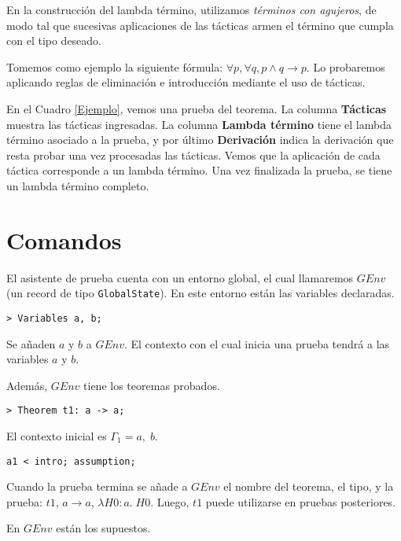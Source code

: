 \documentclass[a4paper,11pt]{article}
\theoremstyle{definition}
\begin{document}
\begin{table}[]
\begin{tabular}{|c|c|c|}
\end{tabular}
\end{table}

En la construcción del lambda término, utilizamos \textit{términos con agujeros}, de modo tal que sucesivas aplicaciones 
de las tácticas armen el término que cumpla con el tipo deseado.

Tomemos como ejemplo la siguiente fórmula: $\forall p, \forall q, p \wedge q \rightarrow p$.
Lo probaremos aplicando reglas de eliminación e introducción mediante el uso de tácticas.

En el Cuadro \ref{Ejemplo}, vemos una prueba del teorema.
La columna \textbf{Tácticas} muestra las tácticas ingresadas. 
La columna \textbf{Lambda término} tiene el lambda término asociado a la prueba, 
y por último \textbf{Derivación} indica la derivación que resta probar una vez procesadas las tácticas.
Vemos que la aplicación de cada táctica corresponde a un lambda término.
Una vez finalizada la prueba, se tiene un lambda término completo.

\section{Comandos}

El asistente de prueba cuenta con un entorno global, el cual llamaremos $GEnv$ (un record de tipo \texttt{GlobalState}).
En este entorno están las variables declaradas.

\begin{verbatim}
> Variables a, b;
\end{verbatim}

Se añaden $a$ y $b$ a $GEnv$. El contexto con el cual inicia una prueba tendrá a las variables $a$ y $b$.

Además, $GEnv$ tiene los teoremas probados.

\begin{verbatim}
> Theorem t1: a -> a;
\end{verbatim}
  
El contexto inicial es $\Gamma_1 = a, \; b$. 

\begin{verbatim}
a1 < intro; assumption;
\end{verbatim}

Cuando la prueba termina se añade a $GEnv$ el nombre del teorema, el tipo, y
la prueba: $t1$, $a \rightarrow a$, $\lambda H0:a. \; H0$.
Luego,  $t1$ puede utilizarse en pruebas posteriores.

En $GEnv$ están los supuestos.
\end{document}
